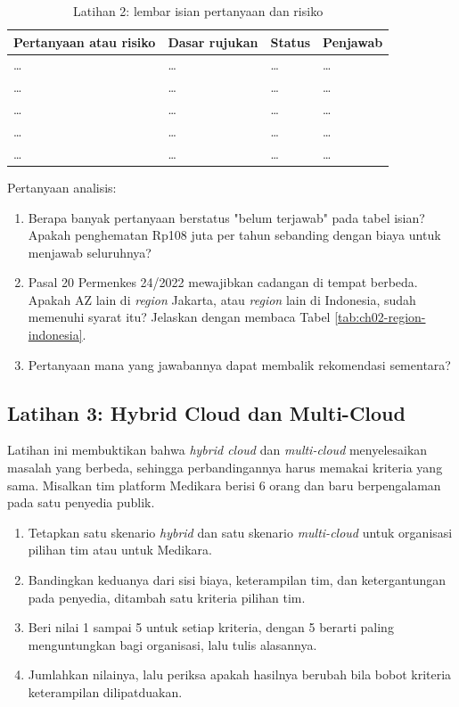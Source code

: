 \begin{table}[!htb]
  \centering
  \caption{Latihan 2: lembar isian pertanyaan dan risiko}
  \label{tab:ch02-lat2-hasil}
  \small
  \begin{tabularx}{\textwidth}{>{\raggedright\arraybackslash}X
      >{\raggedright\arraybackslash}p{2.6cm} >{\raggedright\arraybackslash}p{2.0cm}
      >{\raggedright\arraybackslash}p{1.9cm}}
    \hline
    \textbf{Pertanyaan atau risiko} & \textbf{Dasar rujukan} & \textbf{Status} &
      \textbf{Penjawab} \\
    \hline
    \dots & \dots & \dots & \dots \\
    \hline
    \dots & \dots & \dots & \dots \\
    \hline
    \dots & \dots & \dots & \dots \\
    \hline
    \dots & \dots & \dots & \dots \\
    \hline
    \dots & \dots & \dots & \dots \\
    \hline
  \end{tabularx}
\end{table}

Pertanyaan analisis:
\begin{enumerate}
  \item Berapa banyak pertanyaan berstatus "belum terjawab" pada tabel isian? Apakah
        penghematan Rp108 juta per tahun sebanding dengan biaya untuk menjawab seluruhnya?
  \item Pasal 20 Permenkes 24/2022 mewajibkan cadangan di tempat berbeda. Apakah AZ lain di
        \textit{region} Jakarta, atau \textit{region} lain di Indonesia, sudah memenuhi
        syarat itu? Jelaskan dengan membaca Tabel \ref{tab:ch02-region-indonesia}.
  \item Pertanyaan mana yang jawabannya dapat membalik rekomendasi sementara?
\end{enumerate}

\subsection*{Latihan 3: Hybrid Cloud dan Multi-Cloud}

Latihan ini membuktikan bahwa \textit{hybrid cloud} dan \textit{multi-cloud} menyelesaikan
masalah yang berbeda, sehingga perbandingannya harus memakai kriteria yang sama. Misalkan
tim platform Medikara berisi 6 orang dan baru berpengalaman pada satu penyedia publik.

\begin{enumerate}
  \item Tetapkan satu skenario \textit{hybrid} dan satu skenario \textit{multi-cloud} untuk
        organisasi pilihan tim atau untuk Medikara.
  \item Bandingkan keduanya dari sisi biaya, keterampilan tim, dan ketergantungan pada
        penyedia, ditambah satu kriteria pilihan tim.
  \item Beri nilai 1 sampai 5 untuk setiap kriteria, dengan 5 berarti paling menguntungkan
        bagi organisasi, lalu tulis alasannya.
  \item Jumlahkan nilainya, lalu periksa apakah hasilnya berubah bila bobot kriteria
        keterampilan dilipatduakan.
\end{enumerate}


